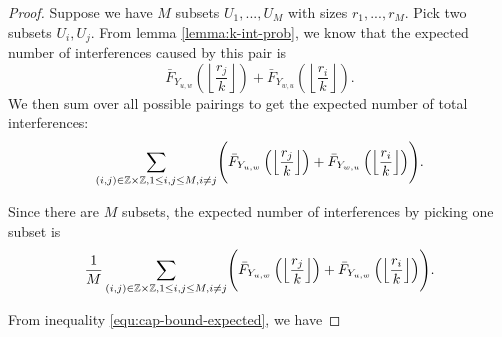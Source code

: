 \begin{proof}

    Suppose we have $M$ subsets $U_1,...,U_M$ with sizes $r_1,...,r_M$. Pick two subsets $U_i,U_j$. From lemma \ref{lemma:k-int-prob}, we know that the expected number of interferences caused by this pair is
    $$
    \bar{F}_{Y_{u,w}}\left(\left\lfloor \frac{r_j}{k} \right\rfloor\right) + \bar{F}_{Y_{w,u}}\left(\left\lfloor \frac{r_i}{k} \right\rfloor\right).
    $$
    We then sum over all possible pairings to get the expected number of total interferences:
    $$
    \sum_{(i,j) \in \mathbb{Z}\times\mathbb{Z}, 1 \le i,j \le M, i \ne j} \Biggl( \bar{F}_{Y_{u,w}}\left(\left\lfloor \frac{r_j}{k} \right\rfloor\right) + \bar{F}_{Y_{w,u}}\left(\left\lfloor \frac{r_i}{k} \right\rfloor\right) \Biggr).
    $$

\noindent Since there are $M$ subsets, the expected number of interferences by picking one subset is
    $$
    \frac{1}{M} \sum_{(i,j) \in \mathbb{Z}\times\mathbb{Z}, 1 \le i,j \le M, i \ne j}  \Biggl( \bar{F}_{Y_{u,w}}\left(\left\lfloor \frac{r_j}{k} \right\rfloor\right) + \bar{F}_{Y_{u,w}}\left(\left\lfloor \frac{r_i}{k} \right\rfloor\right) \Biggr).
    $$

\noindent From inequality \ref{equ:cap-bound-expected}, we have 


\end{proof}
